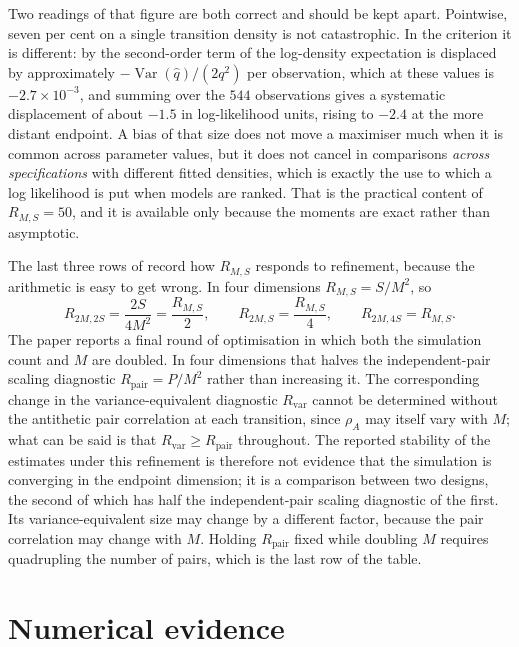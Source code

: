 \documentclass[11pt]{article}
\theoremstyle{definition}
\newcommand{\Var}{\operatorname{Var}}
\begin{document}
Two readings of that figure are both correct and should be kept apart. Pointwise, seven per cent on a single transition density is not catastrophic. In the criterion it is different: by the second-order term of  the log-density expectation is displaced by approximately $-\Var(\widehat q)/(2q^2)$ per observation, which at these values is $-2.7\times10^{-3}$, and summing over the $544$ observations gives a systematic displacement of about $-1.5$ in log-likelihood units, rising to $-2.4$ at the more distant endpoint. A bias of that size does not move a maximiser much when it is common across parameter values, but it does not cancel in comparisons \emph{across specifications} with different fitted densities, which is exactly the use to which a log likelihood is put when models are ranked. That is the practical content of $R_{M,S}=50$, and it is available only because the moments are exact rather than asymptotic.

The last three rows of  record how $R_{M,S}$ responds to refinement, because the arithmetic is easy to get wrong. In four dimensions $R_{M,S}=S/M^2$, so
\begin{equation}\label{eq:doubling_arithmetic}
R_{2M,2S}=\frac{2S}{4M^2}=\frac{R_{M,S}}{2},
\qquad
R_{2M,S}=\frac{R_{M,S}}{4},
\qquad
R_{2M,4S}=R_{M,S}.
\end{equation}
The paper reports a final round of optimisation in which both the simulation count and $M$ are doubled. In four dimensions that halves the independent-pair scaling diagnostic $R_{\mathrm{pair}}=P/M^2$ rather than increasing it. The corresponding change in the variance-equivalent diagnostic $R_{\mathrm{var}}$ cannot be determined without the antithetic pair correlation at each transition, since $\rho_A$ may itself vary with $M$; what can be said is that $R_{\mathrm{var}}\ge R_{\mathrm{pair}}$ throughout. The reported stability of the estimates under this refinement is therefore not evidence that the simulation is converging in the endpoint dimension; it is a comparison between two designs, the second of which has half the independent-pair scaling diagnostic of the first. Its variance-equivalent size may change by a different factor, because the pair correlation may change with $M$. Holding $R_{\mathrm{pair}}$ fixed while doubling $M$ requires quadrupling the number of pairs, which is the last row of the table.

\FloatBarrier
\section{Numerical evidence}\label{sec:numerics}
\end{document}
